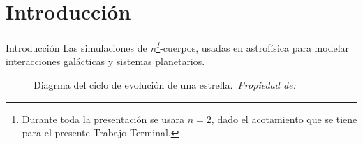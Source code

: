 \section{Introducción}

\begin{frame}{Introducción}
    \vspace{-0.15cm}
    {\fontsize{8pt}{10pt}\selectfont
    Las simulaciones de \textit{n\footnote{\tiny Durante toda la presentación se usara $n = 2$, dado el acotamiento que se tiene para el presente Trabajo Terminal.}}-cuerpos, usadas en astrofísica para modelar interacciones galácticas y sistemas planetarios. %
    }
    \vspace{0cm}
    \begin{figure}[H]
        \centering
        \vspace{-0.25cm}
        \caption{\tiny Diagrma del ciclo de evolución de una estrella.~\textit{Propiedad de: }~\cite{smartyprints_constellation_poster_2025}}%
        \label{fig:star-constellation-map}
    \end{figure}
\end{frame}

